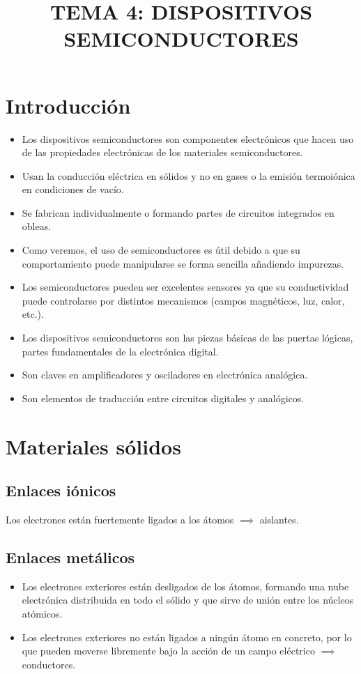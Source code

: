\documentclass[10pt,a4paper]{article}
\begin{document}
	\title{TEMA 4: DISPOSITIVOS SEMICONDUCTORES}
	\date{}
	\author{}
	\maketitle
	
	\section{Introducción}
	\begin{itemize}
		\item Los dispositivos semiconductores son componentes electrónicos que hacen uso de las propiedades electrónicas de los materiales semiconductores.
		\item Usan la conducción eléctrica en sólidos y no en gases o la emisión termoiónica en condiciones de vacío.
		\item Se fabrican individualmente o formando partes de circuitos integrados en obleas.
		\item Como veremos, el uso de semiconductores es útil debido a que su comportamiento puede manipularse se forma sencilla añadiendo impurezas.
		\item Los semiconductores pueden ser excelentes sensores ya que su conductividad puede controlarse por distintos mecanismos (campos magnéticos, luz, calor, etc.).
		\item Los dispositivos semiconductores son las piezas básicas de las puertas lógicas, partes fundamentales de la electrónica digital.
		\item Son claves en amplificadores y osciladores en electrónica analógica.
		\item Son elementos de traducción entre circuitos digitales y analógicos.
	\end{itemize}

	\section{Materiales sólidos}
	
	\subsection{Enlaces iónicos}
	
	Los electrones están fuertemente ligados a los átomos $\implies$ aislantes.
	
	\subsection{Enlaces metálicos}
	\begin{itemize}
		\item Los electrones exteriores están desligados de los átomos, formando una nube electrónica distribuida en todo el sólido y que sirve de unión entre los núcleos atómicos.
		\item Los electrones exteriores no están ligados a ningún átomo en concreto, por lo que pueden moverse libremente bajo la acción de un campo eléctrico $\implies$ conductores.
	\end{itemize}
\end{document}
